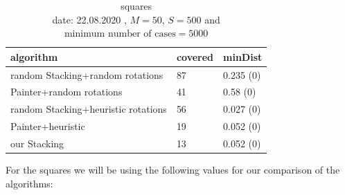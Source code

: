 \documentclass[a4paper,11pt]{article}
\begin{document}
\begin{table}[h]
  \begin{center}
    \begin{tabular}{| l || l | l | }
      \hline
      algorithm                           & covered & minDist \\  %
      \hline

      random Stacking+random rotations    & 87      & 0.235 (0)\\ %

      Painter+random rotations            & 41     & 0.58 (0)\\ %

      random Stacking+heuristic rotations & 56    & 0.027 (0)\\ %

      Painter+heuristic                   & {19}      & 0.052 (0)\\ %

      our Stacking                        & {13}       & 0.052 (0)\\ %

      \hline
    \end{tabular}
  \end{center}
  \caption{squares\\
    date: 22.08.2020  , $M=50$, $S=500$ and $\text{minimum number of cases}=5000$  }
\end{table}

For the squares we will be using the following values for our comparison of the algorithms:
\end{document}
